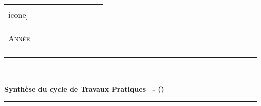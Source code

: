 %
%



\begin{center} %

	\begin{center}
		\begin{tabular}{p{0.3\linewidth}p{0.6\linewidth}}
			\begin{minipage}{\linewidth}
				\begin{center}
					\texttt{[image: \\icone]}\\[0.5cm]
				\end{center}
			\end{minipage}
			&
			\begin{minipage}{\linewidth}
				\textsc{\Large \etablissement}\\[0.3cm]
				\textsc{\large \discipline}\\[0.3cm]
					\textsc{\large \classe}\\[0.3cm]
					\textsc{\large Année \annee}\\
			\end{minipage}
			\end{tabular}
	\end{center}


    
    \rule{\linewidth}{0.5mm}\\[0.4cm]

    {\textsc{\cycle}}\\[0.4cm]

    { \huge \bfseries Synthèse du cycle de Travaux Pratiques \numerotd\ - \titre (\numero)}\\[0.4cm]

    \rule{\linewidth}{0.5mm}\\[1cm]


  \end{center}	%



